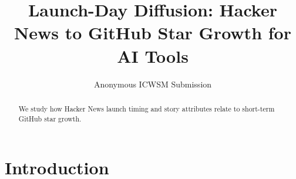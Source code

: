 \documentclass[letterpaper]{article}
\title{Launch-Day Diffusion: Hacker News to GitHub Star Growth for AI Tools}
\author{Anonymous ICWSM Submission}
\begin{document}
\maketitle
\begin{abstract}We study how Hacker News launch timing and story attributes relate to short-term GitHub star growth.\end{abstract}
\section{Introduction}
\end{document}
